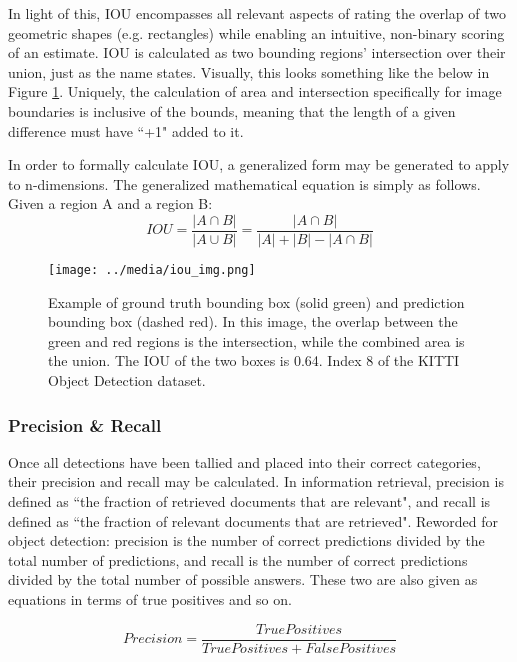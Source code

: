 In light of this, IOU encompasses all relevant aspects of rating the overlap of two geometric shapes (e.g. rectangles) while enabling an intuitive, non-binary scoring of an estimate. IOU is calculated as two bounding regions' intersection over their union, just as the name states. Visually, this looks something like the below in Figure \ref{iou_img}. Uniquely, the calculation of area and intersection specifically for image boundaries is inclusive of the bounds, meaning that the length of a given difference must have ``+1" added to it.

In order to formally calculate IOU, a generalized form may be generated to apply to n-dimensions. The generalized mathematical equation is simply as follows. Given a region A and a region B:
\begin{equation}
IOU = \frac{|A\cap B|}{|A\cup B|} = \frac{|A\cap B|}{|A|+|B|- |A\cap B|}
\end{equation}

\begin{figure}[ht]
    \texttt{[image: ../media/iou\_img.png]}
    \caption{Example of ground truth bounding box (solid green) and prediction bounding box (dashed red). In this image, the overlap between the green and red regions is the intersection, while the combined area is the union. The IOU of the two boxes is 0.64. Index 8 of the KITTI Object Detection dataset.}
    \label{iou_img}
\end{figure}

\subsubsection{Precision \& Recall}
\label{subsect_precrec}
Once all detections have been tallied and placed into their correct categories, their precision and recall may be calculated. In information retrieval, precision is defined as ``the fraction of retrieved documents that are relevant", and recall is defined as ``the fraction of relevant documents that are retrieved". Reworded for object detection: precision is the number of correct predictions divided by the total number of predictions, and recall is the number of correct predictions divided by the total number of possible answers. These two are also given as equations in terms of true positives and so on.

\begin{equation}
Precision = \frac{TruePositives}{TruePositives + FalsePositives}
\label{eq_prec}
\end{equation}

